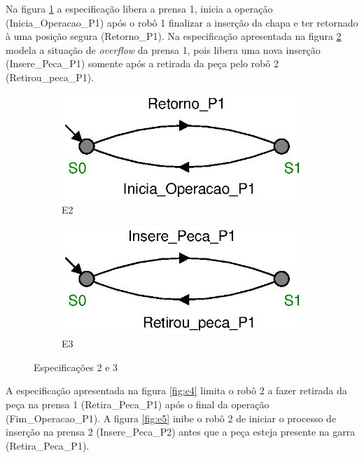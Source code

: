 Na figura \ref{fig:e2} a especificação libera a prensa 1, inicia a operação (Inicia\_Operacao\_P1) após o robô 1 finalizar a inserção da chapa e ter retornado à uma posição segura (Retorno\_P1). Na especificação apresentada na figura \ref{fig:e3} modela a situação de \textit{overflow} da prensa 1, pois libera uma nova inserção (Insere\_Peca\_P1) somente após a retirada da peça pelo robô 2 (Retirou\_peca\_P1).

\begin{figure}[H]%
  \centering
  \begin{subfigure}[b]{0.45\textwidth}
      \centering
      \includegraphics[width=\textwidth]{imagens/E2.eps}
      \caption{E2}
      \label{fig:e2}
  \end{subfigure}
  \hfill
  \begin{subfigure}[b]{0.45\textwidth}
      \centering
      \includegraphics[width=\textwidth]{imagens/E3.eps}
      \caption{E3}
      \label{fig:e3}
  \end{subfigure}
  \caption{Especificações 2 e 3}
  \label{fig:e23}
\end{figure}

A especificação apresentada na figura \ref{fig:e4} limita o robô 2 a fazer retirada da peça na prensa 1 (Retira\_Peca\_P1) após o final da operação (Fim\_Operacao\_P1). A figura \ref{fig:e5} inibe o robô 2 de iniciar o processo de inserção na prensa 2 (Insere\_Peca\_P2) antes que a peça esteja presente na garra (Retira\_Peca\_P1).

